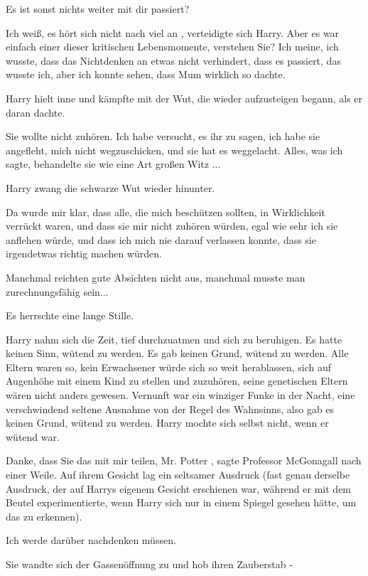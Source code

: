\glqq Es ist sonst nichts weiter mit dir passiert?\grqq{}

\glqq Ich weiß, es hört sich nicht nach viel an\grqq{} , verteidigte sich Harry.
\glqq Aber es war einfach einer dieser kritischen Lebensmomente, verstehen
Sie? Ich meine, ich wusste, dass das Nichtdenken an etwas nicht verhindert,
dass es passiert, das wusste ich, aber ich konnte sehen, dass Mum wirklich
so dachte.\grqq{}

Harry hielt inne und kämpfte mit der Wut, die wieder aufzusteigen begann, als er
daran dachte.

\glqq Sie wollte nicht zuhören. Ich habe versucht, es ihr zu sagen, ich habe sie
angefleht, mich nicht wegzuschicken, und sie hat es weggelacht. Alles, was
ich sagte, behandelte sie wie eine Art großen Witz ...\grqq{}

Harry zwang die schwarze Wut wieder hinunter.

\glqq Da wurde mir klar, dass alle, die mich beschützen sollten, in Wirklichkeit
verrückt waren, und dass sie mir nicht zuhören würden, egal wie sehr ich sie
anflehen würde, und dass ich mich nie darauf verlassen konnte, dass sie
irgendetwas richtig machen würden.\grqq{}

Manchmal reichten gute Absichten nicht aus, manchmal musste man zurechnungsfähig
sein...

Es herrschte eine lange Stille.

Harry nahm sich die Zeit, tief durchzuatmen und sich zu beruhigen. Es hatte
keinen Sinn, wütend zu werden. Es gab keinen Grund, wütend zu werden. Alle
Eltern waren so, kein Erwachsener würde sich so weit herablassen, sich auf
Augenhöhe mit einem Kind zu stellen und zuzuhören, seine genetischen Eltern
wären nicht anders gewesen. Vernunft war ein winziger Funke in der Nacht,
eine verschwindend seltene Ausnahme von der Regel des Wahnsinns, also gab es
keinen Grund, wütend zu werden. Harry mochte sich selbst nicht, wenn er
wütend war.

\glqq Danke, dass Sie das mit mir teilen, Mr. Potter\grqq{} , sagte Professor
McGonagall nach einer Weile. Auf ihrem Gesicht lag ein seltsamer Ausdruck
(fast genau derselbe Ausdruck, der auf Harrys eigenem Gesicht erschienen
war, während er mit dem Beutel experimentierte, wenn Harry sich nur in einem
Spiegel gesehen hätte, um das zu erkennen).

\glqq Ich werde darüber nachdenken müssen.\grqq{}

Sie wandte sich der Gassenöffnung zu und hob ihren Zauberstab -

